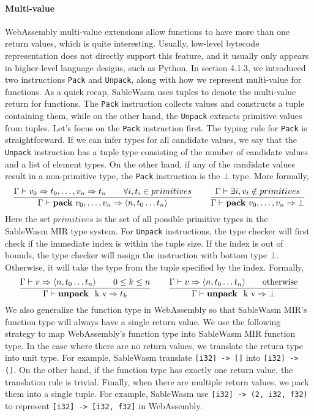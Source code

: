 \paragraph{Multi-value}
WebAssembly multi-value extensions allow functions to have more than one return
values, which is quite interesting. Usually, low-level bytecode representation
does not directly support this feature, and it usually only appears in
higher-level language designs, such as Python. In section 4.1.3, we introduced
two instructions \texttt{Pack} and \texttt{Unpack}, along with how we represent
multi-value for functions. As a quick recap, SableWasm uses tuples to denote the
multi-value return for functions. The \texttt{Pack} instruction collects values
and constructs a tuple containing them, while on the other hand, the
\texttt{Unpack} extracts primitive values from tuples. Let's focus on the
\texttt{Pack} instruction first. The typing rule for \texttt{Pack} is
straightforward. If we can infer types for all candidate values, we say that the
\texttt{Unpack} instruction has a tuple type consisting of the number of
candidate values and a list of element types. On the other hand, if any of the
candidate values result in a non-primitive type, the \texttt{Pack} instruction
is the $\bot$ type. More formally,
$$
    \frac
    {\Gamma \vdash v_0 \Rightarrow t_0, \dots, v_n \Rightarrow t_n \qquad \forall i, t_i \in primitives}
    {\Gamma \vdash \text{\textbf{pack} } v_0, \dots, v_n \Rightarrow \langle n, t_0 \dots t_n \rangle}
    \qquad
    \frac
    {\Gamma \vdash \exists i, v_t \notin primitives}
    {\Gamma \vdash \text{\textbf{pack} } v_0, \dots, v_n \Rightarrow \bot}
$$
Here the set $primitives$ is the set of all possible primitive types in the
SableWasm MIR type system. For \texttt{Unpack} instructions, the type checker
will first check if the immediate index is within the tuple size. If the index
is out of bounds, the type checker will assign the instruction with bottom type
$\bot$. Otherwise, it will take the type from the tuple specified by the index.
Formally,
$$
    \frac
    {\Gamma \vdash v \Rightarrow \langle n, t_0 \dots t_n \rangle \qquad 0 \leq k \leq n}
    {\Gamma \vdash \text{\textbf{unpack } k v} \Rightarrow t_k}
    \qquad
    \frac
    {\Gamma \vdash v \Rightarrow \langle n, t_0 \dots t_n \rangle \qquad \text{otherwise}}
    {\Gamma \vdash \text{\textbf{unpack } k v} \Rightarrow \bot}
$$
We also generalize the function type in WebAssembly so that SableWasm MIR's
function type will always have a single return value. We use the following
strategy to map WebAssembly's function type into SableWasm MIR function type.
In the case where there are no return values, we translate the return type into
unit type. For example, SableWasm translate \texttt{[i32] -> []} into
\texttt{[i32] -> ()}. On the other hand, if the function type has exactly one
return value, the translation rule is trivial. Finally, when there are multiple
return values, we pack them into a single tuple. For example, SableWasm use
\texttt{[i32] -> (2, i32, f32)} to represent \texttt{[i32] -> [i32, f32]} in
WebAssembly.

